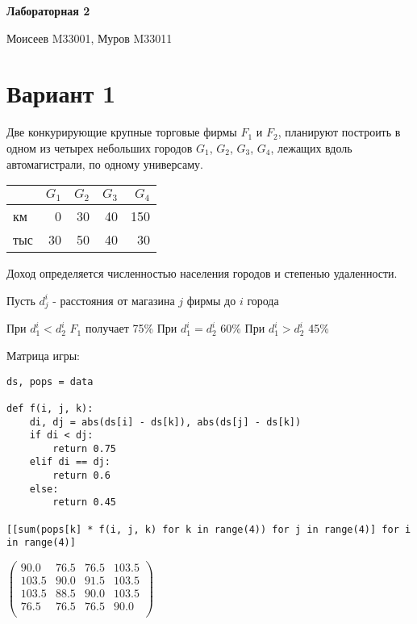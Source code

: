 \documentclass[11pt]{article}
\author{megabluejay}
\date{}
\title{}
\begin{document}
\begin{center}
\textbf{Лабораторная 2}

Моисеев M33001, Муров M33011
\end{center}

\section*{Вариант 1}
\label{sec:org8fcd196}

Две конкурирующие крупные торговые фирмы \(F_1\) и \(F_2\), планируют построить в одном из четырех небольших городов \(G_1\), \(G_2\), \(G_3\), \(G_4\), лежащих вдоль автомагистрали, по одному универсаму.

\begin{table}[htbp]
\label{data1}
\centering
\begin{tabular}{lrrrr}
 & \(G_1\) & \(G_2\) & \(G_3\) & \(G_4\)\\[0pt]
\hline
км & 0 & 30 & 40 & 150\\[0pt]
тыс & 30 & 50 & 40 & 30\\[0pt]
\end{tabular}
\end{table}


Доход определяется численностью населения городов и степенью удаленности.

Пусть \(d_j^i\) - расстояния от магазина \(j\) фирмы до \(i\) города

При \(d_1^i < d_2^i\) \(F_1\) получает 75\%
При \(d_1^i = d_2^i\) 60\%
При \(d_1^i > d_2^i\) 45\%

Матрица игры:

\begin{verbatim}
ds, pops = data

def f(i, j, k):
    di, dj = abs(ds[i] - ds[k]), abs(ds[j] - ds[k])
    if di < dj:
        return 0.75
    elif di == dj:
        return 0.6
    else:
        return 0.45

[[sum(pops[k] * f(i, j, k) for k in range(4)) for j in range(4)] for i in range(4)]
\end{verbatim}

\(\begin{pmatrix}
 90.0 & 76.5 & 76.5 & 103.5 \\[0pt]
 103.5 & 90.0 & 91.5 & 103.5 \\[0pt]
 103.5 & 88.5 & 90.0 & 103.5 \\[0pt]
 76.5 & 76.5 & 76.5 & 90.0 \\[0pt]
\end{pmatrix}
\)
\end{document}
